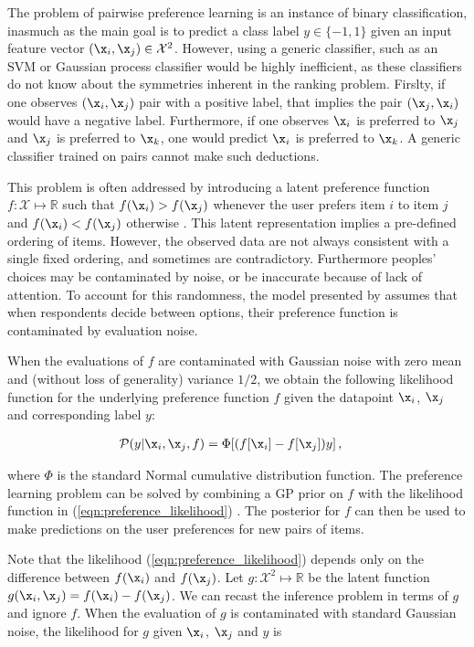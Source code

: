 The problem of pairwise preference learning is an instance of binary classification, inasmuch as the main goal is to predict a class label $y\in\{-1,1\}$ given an input feature vector $(\x_i,\x_j)\in\mathcal{X}^2$. However, using a generic classifier, such as an SVM or Gaussian process classifier would be highly inefficient, as these classifiers do not know about the symmetries inherent in the ranking problem. Firslty, if one observes $(\x_i,\x_j)$ pair with a positive label, that implies the pair $(\x_j,\x_i)$ would have a negative label. Furthermore, if one observes $\x_i$ is preferred to $\x_j$ and $\x_j$ is preferred to $\x_k$, one would predict $\x_i$ is preferred to $\x_k$. A generic classifier trained on pairs cannot make such deductions.

This problem is often addressed by introducing a latent preference function $f:\mathcal{X}\mapsto \mathbb{R}$ such that
$f(\x_i) > f(\x_j)$ whenever the user prefers item $i$ to item $j$ and $f(\x_i) < f(\x_j)$ otherwise \citep{chu2005}. This latent representation implies a pre-defined ordering of items. However, the observed data are not always consistent with a single fixed ordering, and sometimes are contradictory. Furthermore peoples' choices may be contaminated by noise, or be inaccurate because of lack of attention. To account for this randomness, the model presented by \citep{chu2005} assumes that when respondents decide between options, their preference function is contaminated by evaluation noise.

When the evaluations of $f$ are contaminated with Gaussian noise with zero mean and (without loss of generality) variance $1/2$, we obtain the following likelihood function for the underlying preference function $f$ given the datapoint $\x_i$, $\x_j$ and corresponding label $y$:

\begin{align}
\mathcal{P}(y|\x_i,\x_j,f) &= \Phi[(f[\x_i] - f[\x_j])y]\,,\label{eqn:preference_likelihood}
\end{align}

where $\Phi$ is the standard Normal cumulative distribution function. The preference learning problem can be solved by combining a GP prior on $f$ with the likelihood function in (\ref{eqn:preference_likelihood}) \cite{chu2005}. The posterior for $f$ can
then be used to make predictions on the user preferences for new pairs of items.

Note that the likelihood (\ref{eqn:preference_likelihood}) depends only on the difference between $f(\x_i)$ and $f(\x_j)$.
Let $g:\mathcal{X}^2\mapsto\mathbb{R}$ be the latent function $g(\x_i,\x_j) = f(\x_i) - f(\x_j)$.
We can recast the inference problem in terms of $g$ and ignore $f$. When the evaluation of $g$ is contaminated with standard Gaussian noise, the likelihood for $g$ given $\x_i$, $\x_j$ and $y$ is

